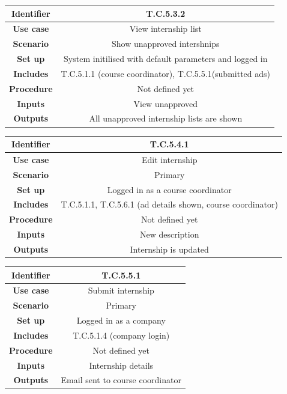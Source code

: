 \documentclass{l3deliverable}
\begin{document}
\begin{tabular}{|c|c|}
\hline \textbf{Identifier} & T.C.5.3.2 \\
\hline \textbf{Use case} & View internship list\\
\hline \textbf{Scenario} & Show unapproved intershnips\\
\hline \textbf{Set up} & System initilised with default parameters and logged in\\
\hline \textbf{Includes} &T.C.5.1.1 (course coordinator), T.C.5.5.1(submitted ads)\\
\hline \textbf{Procedure} & Not defined yet\\
\hline \textbf{Inputs} & View unapproved\\
\hline \textbf{Outputs} & All unapproved internship lists are shown\\
\hline
\end{tabular}

\begin{tabular}{|c|c|}
\hline \textbf{Identifier} & T.C.5.4.1 \\
\hline \textbf{Use case} & Edit internship\\
\hline \textbf{Scenario} & Primary\\
\hline \textbf{Set up} & Logged in as a course coordinator\\
\hline \textbf{Includes} & T.C.5.1.1, T.C.5.6.1 (ad details shown, course coordinator)\\
\hline \textbf{Procedure} & Not defined yet \\
\hline \textbf{Inputs} & New description\\
\hline \textbf{Outputs} & Internship is updated\\
\hline
\end{tabular}

\begin{tabular}{|c|c|}
\hline \textbf{Identifier} & T.C.5.5.1\\
\hline \textbf{Use case} & Submit internship\\
\hline \textbf{Scenario} & Primary\\
\hline \textbf{Set up} & Logged in as a company\\
\hline \textbf{Includes} & T.C.5.1.4 (company login)\\
\hline \textbf{Procedure} & Not defined yet\\
\hline \textbf{Inputs} & Internship details\\
\hline \textbf{Outputs} & Email sent to course coordinator\\
\hline
\end{tabular}
\end{document}
